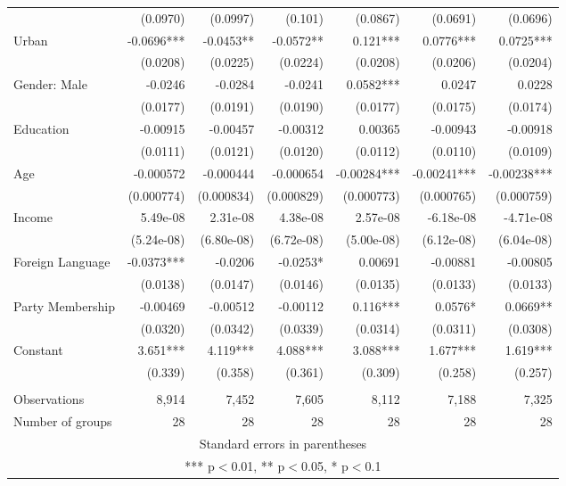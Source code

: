 \documentclass[12pt]{article}\usepackage[]{graphicx}\usepackage[]{color}
\begin{document}
\begin{table}[htbp]
\begin{tabular}{lrrrrrr}
	 & (0.0970) & (0.0997) & (0.101) & (0.0867) & (0.0691) & (0.0696) \\
	 Urban & -0.0696*** & -0.0453** & -0.0572** & 0.121*** & 0.0776*** & 0.0725*** \\
	 & (0.0208) & (0.0225) & (0.0224) & (0.0208) & (0.0206) & (0.0204) \\
	 Gender: Male & -0.0246 & -0.0284 & -0.0241 & 0.0582*** & 0.0247 & 0.0228 \\
	 & (0.0177) & (0.0191) & (0.0190) & (0.0177) & (0.0175) & (0.0174) \\
	 Education & -0.00915 & -0.00457 & -0.00312 & 0.00365 & -0.00943 & -0.00918 \\
	 & (0.0111) & (0.0121) & (0.0120) & (0.0112) & (0.0110) & (0.0109) \\
	 Age   & -0.000572 & -0.000444 & -0.000654 & -0.00284*** & -0.00241*** & -0.00238*** \\
	 & (0.000774) & (0.000834) & (0.000829) & (0.000773) & (0.000765) & (0.000759) \\
	 Income & 5.49e-08 & 2.31e-08 & 4.38e-08 & 2.57e-08 & -6.18e-08 & -4.71e-08 \\
	 & (5.24e-08) & (6.80e-08) & (6.72e-08) & (5.00e-08) & (6.12e-08) & (6.04e-08) \\
	 Foreign Language & -0.0373*** & -0.0206 & -0.0253* & 0.00691 & -0.00881 & -0.00805 \\
	 & (0.0138) & (0.0147) & (0.0146) & (0.0135) & (0.0133) & (0.0133) \\
	 Party Membership & -0.00469 & -0.00512 & -0.00112 & 0.116*** & 0.0576* & 0.0669** \\
	 & (0.0320) & (0.0342) & (0.0339) & (0.0314) & (0.0311) & (0.0308) \\
	 Constant & 3.651*** & 4.119*** & 4.088*** & 3.088*** & 1.677*** & 1.619*** \\
	 & (0.339) & (0.358) & (0.361) & (0.309) & (0.258) & (0.257) \\
	 &       &       &       &       &       &  \\
	 Observations & 8,914 & 7,452 & 7,605 & 8,112 & 7,188 & 7,325 \\
	 Number of groups & 28    & 28    & 28    & 28    & 28    & 28 \\ 
		\hline
		\multicolumn{7}{c}{Standard errors in parentheses} \\
		\multicolumn{7}{c}{*** p$<$0.01, ** p$<$0.05, * p$<$0.1} \\
	\end{tabular}\\
\end{table}%
\end{document}
